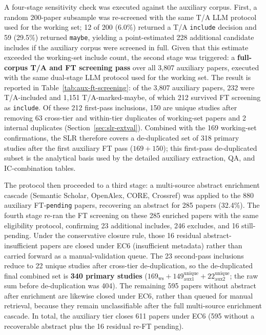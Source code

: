 A four-stage sensitivity check was executed against the auxiliary corpus.
First, a random 200-paper subsample was re-screened with the same T/A LLM
protocol used for the working set; 12 of 200 (6.0\%) returned a T/A
\texttt{include} decision and 59 (29.5\%) returned \texttt{maybe}, yielding
a point-estimated 228 additional candidate includes if the auxiliary corpus
were screened in full. Given that this estimate exceeded the working-set
include count, the second stage was triggered: a \textbf{full-corpus
T/A and FT screening pass} over all 3{,}807 auxiliary papers, executed
with the same dual-stage LLM protocol used for the working set. The result
is reported in
Table~\ref{tab:aux-ft-screening}: of the 3{,}807 auxiliary papers, 232
were T/A-included and 1{,}151 T/A-marked-maybe, of which 212 survived FT
screening as \texttt{include}. Of these 212 first-pass inclusions, 150 are
unique studies after removing 63 cross-tier and within-tier duplicates of working-set
papers and 2 internal duplicates (Section~\ref{sec:slr-extval}). Combined
with the 169 working-set confirmations, the SLR therefore covers a
de-duplicated set of 318 primary studies after the first auxiliary FT pass
($169 + 150$); this first-pass de-duplicated subset is the analytical basis
used by the detailed auxiliary extraction, QA, and IC-combination tables.

The protocol then proceeded to a third stage: a multi-source abstract
enrichment cascade (Semantic Scholar, OpenAlex, CORE, Crossref) was applied
to the 880 auxiliary FT-\texttt{pending} papers, recovering an abstract for
285 papers (32.4\%). The fourth stage re-ran the FT screening on these 285
enriched papers with the same eligibility protocol, confirming 23 additional
includes,
246 excludes, and 16 still-pending. Under the conservative closure rule,
those 16 residual abstract-insufficient papers are closed under EC6
(insufficient metadata) rather than carried forward as a manual-validation
queue. The 23 second-pass
inclusions reduce to 22 unique studies after cross-tier de-duplication, so
the de-duplicated final combined set is \textbf{340 primary studies}
($169_{\text{ws}} + 149_{\text{aux1}}^{\text{unique}} +
22_{\text{aux2}}^{\text{unique}}$; the raw sum before de-duplication was
404). The remaining
595 papers without abstract after enrichment are likewise closed under EC6,
rather than queued for manual retrieval, because they remain
unclassifiable after the full multi-source enrichment cascade. In total, the
auxiliary tier closes 611 papers under EC6 (595 without a recoverable
abstract plus the 16 residual re-FT pending).

